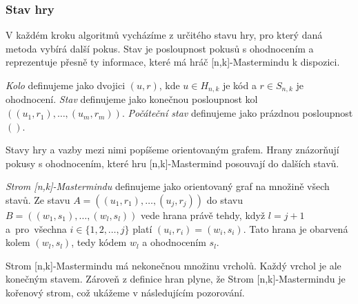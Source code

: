
\subsubsection{Stav hry}
V každém kroku algoritmů vycházíme z určitého stavu hry, pro který daná metoda vybírá další pokus. Stav je posloupnost pokusů s ohodnocením a reprezentuje přesně ty informace, které má hráč [n,k]-Mastermindu k dispozici.

\begin{definice}\label{stav}
   \emph{Kolo} definujeme jako dvojici $(u,r)$, kde $u \in H_{n,k}$ je kód a $r \in S_{n,k}$ je ohodnocení. 
   \emph{Stav} definujeme jako konečnou posloupnost kol $((u_1, r_1), \dots, (u_m, r_m))$. \emph{Počáteční stav} definujeme jako prázdnou posloupnost $()$.
\end{definice}

Stavy hry a vazby mezi nimi popíšeme orientovaným grafem. Hrany znázorňují pokusy s ohodnocením, které hru [n,k]-Mastermind posouvají do dalších stavů. 
\begin{definice}
  \emph{Strom [n,k]-Mastermindu} definujeme jako orientovaný graf na množině všech stavů. Ze stavu $A = \left((u_1, r_1),\dots, (u_j,r_j)\right)$ do stavu $B = \left((w_1, s_1), \dots, (w_l,s_l)\right)$ vede hrana právě tehdy, když $l = j+1$ a~pro~všechna $ i \in \{1,2,\dots, j\}$ platí $ (u_i, r_i) = (w_i, s_i)$. Tato hrana je obarvená kolem $(w_l, s_l)$, tedy kódem $w_l$ a ohodnocením $s_l$.
\end{definice}
Strom [n,k]-Mastermindu má nekonečnou množinu vrcholů. Každý vrchol je ale konečným stavem. Zároveň z definice hran plyne, že Strom [n,k]-Mastermindu je kořenový strom, což ukážeme v následujícím pozorování.

